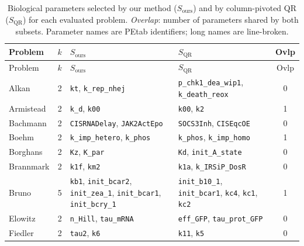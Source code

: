 {\scriptsize
\begin{longtable}{@{}>{\raggedright\arraybackslash}p{2.3cm}r>{\raggedright\arraybackslash}p{4.0cm}>{\raggedright\arraybackslash}p{4.0cm}c@{}}
\caption{Biological parameters selected by our method ($S_{\mathrm{ours}}$) and by column-pivoted QR ($S_{\mathrm{QR}}$) for each evaluated problem. \emph{Overlap}: number of parameters shared by both subsets. Parameter names are PEtab identifiers; long names are line-broken.}\label{tab:brun_params}\\
\toprule
Problem & $k$ & $S_{\mathrm{ours}}$ & $S_{\mathrm{QR}}$ & Ovlp \\
\midrule \endfirsthead
\toprule Problem & $k$ & $S_{\mathrm{ours}}$ & $S_{\mathrm{QR}}$ & Ovlp \\ \midrule \endhead
Alkan & 2
  & \texttt{kt}, \texttt{k\_\allowbreak{}rep\_\allowbreak{}nhej}
  & \texttt{p\_\allowbreak{}chk1\_\allowbreak{}dea\_\allowbreak{}wip1}, \texttt{k\_\allowbreak{}death\_\allowbreak{}reox}
  & 0 \\
Armistead & 2
  & \texttt{k\_\allowbreak{}d}, \texttt{k00}
  & \texttt{k00}, \texttt{k2}
  & 1 \\
Bachmann & 2
  & \texttt{CISRNADelay}, \texttt{JAK2ActEpo}
  & \texttt{SOCS3Inh}, \texttt{CISEqcOE}
  & 0 \\
Boehm & 2
  & \texttt{k\_\allowbreak{}imp\_\allowbreak{}hetero}, \texttt{k\_\allowbreak{}phos}
  & \texttt{k\_\allowbreak{}phos}, \texttt{k\_\allowbreak{}imp\_\allowbreak{}homo}
  & 1 \\
Borghans & 2
  & \texttt{Kz}, \texttt{K\_\allowbreak{}par}
  & \texttt{Kd}, \texttt{init\_\allowbreak{}A\_\allowbreak{}state}
  & 0 \\
Brannmark & 2
  & \texttt{k1f}, \texttt{km2}
  & \texttt{k1a}, \texttt{k\_\allowbreak{}IRSiP\_\allowbreak{}DosR}
  & 0 \\
Bruno & 5
  & \texttt{kb1}, \texttt{init\_\allowbreak{}bcar2}, \texttt{init\_\allowbreak{}zea\_\allowbreak{}1}, \texttt{init\_\allowbreak{}bcar1}, \texttt{init\_\allowbreak{}bcry\_\allowbreak{}1}
  & \texttt{init\_\allowbreak{}b10\_\allowbreak{}1}, \texttt{init\_\allowbreak{}bcar1}, \texttt{kc4}, \texttt{kc1}, \texttt{kc2}
  & 1 \\
Elowitz & 2
  & \texttt{n\_\allowbreak{}Hill}, \texttt{tau\_\allowbreak{}mRNA}
  & \texttt{eff\_\allowbreak{}GFP}, \texttt{tau\_\allowbreak{}prot\_\allowbreak{}GFP}
  & 0 \\
Fiedler & 2
  & \texttt{tau2}, \texttt{k6}
  & \texttt{k11}, \texttt{k5}
  & 0 \\

\end{longtable}}

